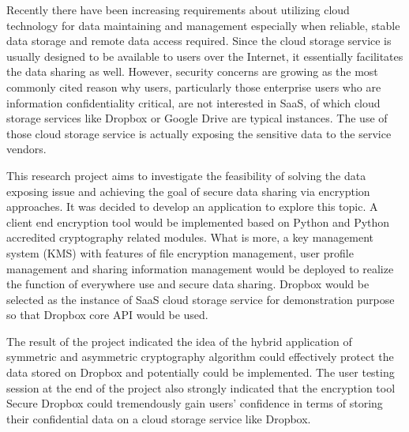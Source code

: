\documentclass[a4paper, 12pt, oneside]{report}         %
\begin{document}
\begin{thesisabstract}

Recently there have been increasing requirements about utilizing cloud technology for data maintaining and management especially when reliable, stable data storage and remote data access required. Since the cloud storage service is usually designed to be available to users over the Internet, it essentially facilitates the data sharing as well. However, security concerns are growing as the most commonly cited reason why users, particularly those enterprise users who are information confidentiality critical, are not interested in SaaS, of which cloud storage services like Dropbox or Google Drive are typical instances. The use of those cloud storage service is actually exposing the sensitive data to the service vendors.

This research project aims to investigate the feasibility of solving the data exposing issue and achieving the goal of secure data sharing via encryption approaches. It was decided to develop an application to explore this topic. A client end encryption tool would be implemented based on Python and Python accredited cryptography related modules. What is more, a key management system (KMS) with features of file encryption management, user profile management and sharing information management would be deployed to realize the function of everywhere use and secure data sharing. Dropbox would be selected as the instance of SaaS cloud storage service for demonstration purpose so that Dropbox core API would be used.

The result of the project indicated the idea of the hybrid application of symmetric and asymmetric cryptography algorithm could effectively protect the data stored on Dropbox and potentially could be implemented. The user testing session at the end of the project also strongly indicated that the encryption tool Secure Dropbox could tremendously gain users’ confidence in terms of storing their confidential data on a cloud storage service like Dropbox.

\end{thesisabstract}

\tableofcontents                                  %
\listoftables                                     %
\listoffigures                                    %

  
  
  
  
  
  
\end{document}
